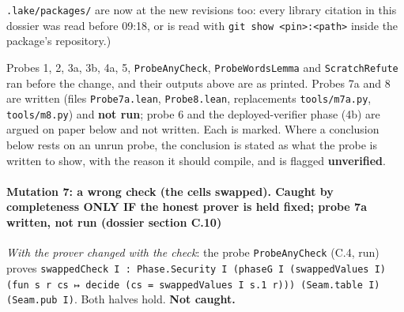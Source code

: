 \texttt{.\allowbreak{}lake/\allowbreak{}packages/} are now at the new revisions too: every library citation in this dossier was read before 09:18, or is read with \texttt{git show <pin>:<path>} inside the package's repository.)

Probes 1, 2, 3a, 3b, 4a, 5, \texttt{ProbeAnyCheck}, \texttt{ProbeWordsLemma} and \texttt{ScratchRefute} ran before the change, and their outputs above are as printed. Probes 7a and 8 are written (files \texttt{Probe7a.\allowbreak{}lean}, \texttt{Probe8.\allowbreak{}lean}, replacements \texttt{tools/\allowbreak{}m7a.\allowbreak{}py}, \texttt{tools/\allowbreak{}m8.\allowbreak{}py}) and \textbf{not run}; probe 6 and the deployed-verifier phase (4b) are argued on paper below and not written. Each is marked. Where a conclusion below rests on an unrun probe, the conclusion is stated as what the probe is written to show, with the reason it should compile, and is flagged \textbf{unverified}.

\paragraph{Mutation 7: a wrong check (the cells swapped). Caught by completeness ONLY IF the honest prover is held fixed; probe 7a written, not run (dossier section C.10)}\label{sec:gen-pubinput-C10}

\emph{With the prover changed with the check}: the probe \texttt{ProbeAnyCheck} (C.4, run) proves \texttt{s\allowbreak{}w\allowbreak{}a\allowbreak{}p\allowbreak{}p\allowbreak{}e\allowbreak{}d\allowbreak{}C\allowbreak{}h\allowbreak{}e\allowbreak{}c\allowbreak{}k\allowbreak{} I\allowbreak{} :\allowbreak{} P\allowbreak{}h\allowbreak{}a\allowbreak{}s\allowbreak{}e\allowbreak{}.\allowbreak{}S\allowbreak{}e\allowbreak{}c\allowbreak{}u\allowbreak{}r\allowbreak{}i\allowbreak{}t\allowbreak{}y\allowbreak{} I\allowbreak{} (\allowbreak{}p\allowbreak{}h\allowbreak{}a\allowbreak{}s\allowbreak{}e\allowbreak{}G\allowbreak{} I\allowbreak{} (\allowbreak{}s\allowbreak{}w\allowbreak{}a\allowbreak{}p\allowbreak{}p\allowbreak{}e\allowbreak{}d\allowbreak{}V\allowbreak{}a\allowbreak{}l\allowbreak{}u\allowbreak{}e\allowbreak{}s\allowbreak{} I\allowbreak{})\allowbreak{} (\allowbreak{}f\allowbreak{}u\allowbreak{}n\allowbreak{} s\allowbreak{} r\allowbreak{} c\allowbreak{}s\allowbreak{} ↦\allowbreak{} d\allowbreak{}e\allowbreak{}c\allowbreak{}i\allowbreak{}d\allowbreak{}e\allowbreak{} (\allowbreak{}c\allowbreak{}s\allowbreak{} =\allowbreak{} s\allowbreak{}w\allowbreak{}a\allowbreak{}p\allowbreak{}p\allowbreak{}e\allowbreak{}d\allowbreak{}V\allowbreak{}a\allowbreak{}l\allowbreak{}u\allowbreak{}e\allowbreak{}s\allowbreak{} I\allowbreak{} s\allowbreak{}.\allowbreak{}1\allowbreak{} r\allowbreak{})\allowbreak{})\allowbreak{})\allowbreak{} (\allowbreak{}S\allowbreak{}e\allowbreak{}a\allowbreak{}m\allowbreak{}.\allowbreak{}t\allowbreak{}a\allowbreak{}b\allowbreak{}l\allowbreak{}e\allowbreak{} I\allowbreak{})\allowbreak{} (\allowbreak{}S\allowbreak{}e\allowbreak{}a\allowbreak{}m\allowbreak{}.\allowbreak{}p\allowbreak{}u\allowbreak{}b\allowbreak{} I\allowbreak{})}. Both halves hold. \textbf{Not caught.}

